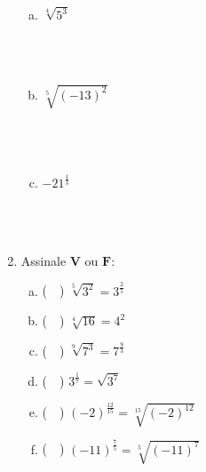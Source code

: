 \documentclass[a4paper,14pt]{article}
\begin{document}
\begin{multicols}{2}
\begin{enumerate}
\begin{enumerate}[a)]
            	\item $\sqrt[4]{5^3}$ \\\\\\\\
            	\item $\sqrt[5]{(-13)^2}$ \\\\\\\\
            	\item $-21^\frac{1}{3}$ \\\\\\\\
            \end{enumerate}
            \item Assinale $\textbf{V}$ ou $\textbf{F}$:
            \begin{enumerate}[a)]
            	\item (~~) $\sqrt[5]{3^2} = 3^\frac{2}{5}$
            	\item (~~) $\sqrt[4]{16} = 4^2$
            	\item (~~) $\sqrt[9]{7^3} = 7^\frac{9}{3}$
            	\item (~~) $3^\frac{1}{7} = \sqrt{3^7}$
            	\item (~~) $(-2)^\frac{12}{15} = \sqrt[15]{(-2)^{12}}$
            	\item (~~) $(-11)^\frac{7}{5} = \sqrt[5]{(-11)^7}$ 
            \end{enumerate}
        \end{enumerate}

\end{multicols}
\end{document}
